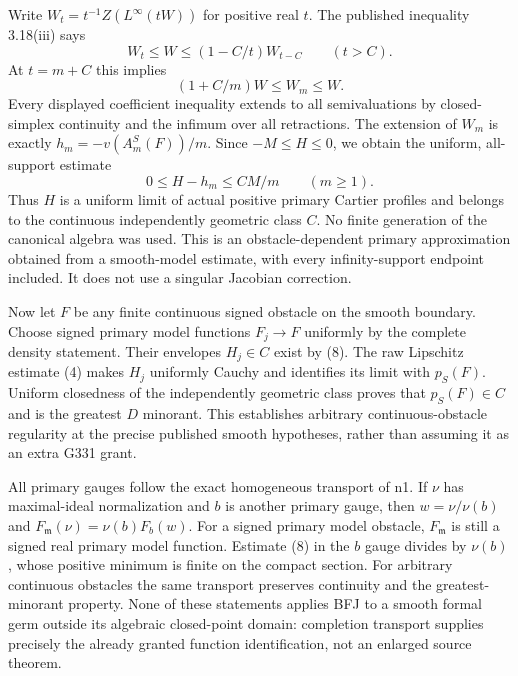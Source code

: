 Write $W_t=t^{-1}Z(L^\infty(tW))$ for positive real $t$. The published inequality 3.18(iii) says
\[
 W_t\le W\le (1-C/t)W_{t-C}\qquad(t>C).
\] At $t=m+C$ this implies
\[
 (1+C/m)W\le W_m\le W.
\]
Every displayed coefficient inequality extends to all semivaluations by closed-simplex continuity and the infimum over all retractions. The extension of $W_m$ is exactly $h_m=-v(A_m^S(F))/m$. Since $-M\le H\le0$, we obtain the uniform, all-support estimate
\[
 0\le H-h_m\le CM/m\qquad(m\ge1). \tag{8}
\]
Thus $H$ is a uniform limit of actual positive primary Cartier profiles and belongs to the continuous independently geometric class $C$. No finite generation of the canonical algebra was used. This is an obstacle-dependent primary approximation obtained from a smooth-model estimate, with every infinity-support endpoint included. It does not use a singular Jacobian correction.

Now let $F$ be any finite continuous signed obstacle on the smooth boundary. Choose signed primary model functions $F_j\to F$ uniformly by the complete density statement. Their envelopes $H_j\in C$ exist by (8). The raw Lipschitz estimate (4) makes $H_j$ uniformly Cauchy and identifies its limit with $p_S(F)$. Uniform closedness of the independently geometric class proves that $p_S(F)\in C$ and is the greatest $D$ minorant. This establishes arbitrary continuous-obstacle regularity at the precise published smooth hypotheses, rather than assuming it as an extra G331 grant.

All primary gauges follow the exact homogeneous transport of n1. If $\nu$ has maximal-ideal normalization and $b$ is another primary gauge, then $w=\nu/\nu(b)$ and $F_{\mathfrak m}(\nu)=\nu(b)F_b(w)$. For a signed primary model obstacle, $F_{\mathfrak m}$ is still a signed real primary model function. Estimate (8) in the $b$ gauge divides by $\nu(b)$, whose positive minimum is finite on the compact section. For arbitrary continuous obstacles the same transport preserves continuity and the greatest-minorant property. None of these statements applies BFJ to a smooth formal germ outside its algebraic closed-point domain: completion transport supplies precisely the already granted function identification, not an enlarged source theorem.
